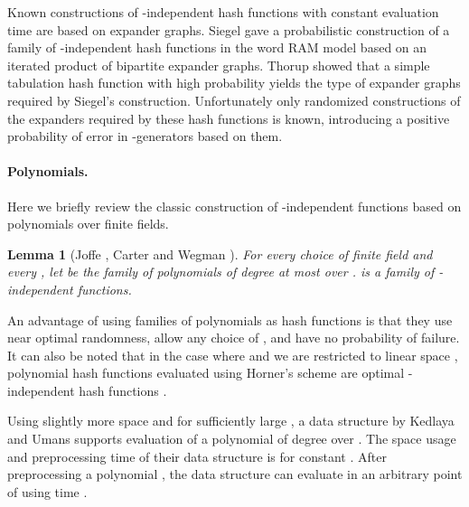 \documentclass[a4paper,11pt]{article}
\theoremstyle{plain}
\newtheorem{lemma}{Lemma}
\theoremstyle{definition}
\begin{document}
Known constructions of -independent hash functions with constant evaluation time are based on expander graphs.
Siegel \cite{siegel2004} gave a probabilistic construction of a family of \mbox{-independent} hash functions in the word RAM model based on an iterated product of bipartite expander graphs. 
Thorup \cite{thorup2013} showed that a simple tabulation hash function with high probability yields the type of expander graphs required by Siegel's construction.
Unfortunately only randomized constructions of the expanders required by these hash functions is known, introducing a positive probability of error in \mbox{-generators} based on them.

\paragraph{Polynomials.}
Here we briefly review the classic construction of -independent functions based on polynomials over finite fields.  
\begin{lemma}[Joffe \cite{joffe1974}, Carter and Wegman \cite{wegman1981}] \label{lem:kpoly}
For every choice of finite field  and every , let  be the family of polynomials of degree at most  over .
 is a family of -independent functions.
\end{lemma}

An advantage of using families of polynomials as hash functions is that they use near optimal randomness, allow any choice of , and have no probability of failure. 
It can also be noted that in the case where  and we are restricted to linear space , 
polynomial hash functions evaluated using Horner's scheme are optimal \mbox{-independent} hash functions \cite{larsen2012, siegel2004}.   

Using slightly more space and for sufficiently large , a data structure by Kedlaya and Umans \cite{kedlaya2008} supports evaluation of a polynomial of degree  over .
The space usage and preprocessing time of their data structure is  for constant .
After preprocessing a polynomial , the data structure can evaluate  in an arbitrary point of  using time .         
\end{document}
